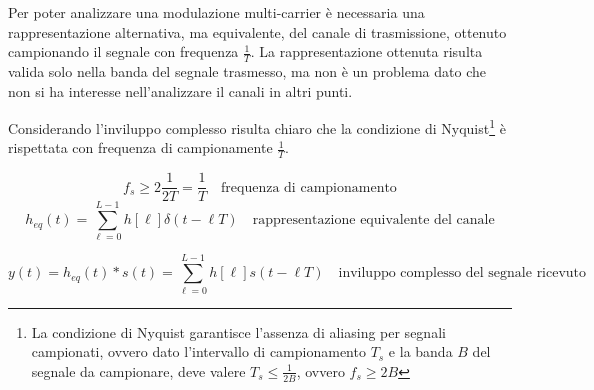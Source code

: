 \begin{center}
{
    }
\end{center}
Per poter analizzare una modulazione multi-carrier è necessaria una rappresentazione alternativa, ma equivalente, del canale di trasmissione, ottenuto campionando il segnale con frequenza $\frac{1}{T}$. La rappresentazione ottenuta risulta valida solo nella banda del segnale trasmesso, ma non è un problema dato che non si ha interesse nell'analizzare il canali in altri punti.

Considerando l'inviluppo complesso risulta chiaro che la condizione di Nyquist\footnote{\label{nyquist_cond} La condizione di Nyquist garantisce l'assenza di aliasing per segnali campionati, ovvero dato l'intervallo di campionamento $T_s$ e la banda $B$ del segnale da campionare, deve valere $T_s \leq \frac{1}{2B}$, ovvero $f_s \geq 2B$} è rispettata con frequenza di campionamente $\frac{1}{T}$.



\[
    f_s \geq 2 \frac{1}{2T} = \frac{1}{T} \quad \text{frequenza di campionamento} 
\]
\[
    h_{eq}(t) = \sum_{\ell=0}^{L-1} h \left[\ell\right] \delta(t - \ell T) \quad \text{rappresentazione equivalente del canale}
\]

\[
    y(t) = h_{eq}(t) \ast s(t) = \sum_{\ell=0}^{L-1} h\left[\ell\right] s(t - \ell T) \quad \text{inviluppo complesso del segnale ricevuto}
\]


